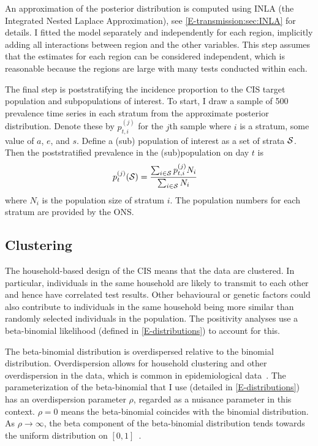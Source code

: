 \documentclass[thesis.tex]{subfiles}
\begin{document}
An approximation of the posterior distribution is computed using INLA (the Integrated Nested Laplace Approximation), see \cref{E-transmission:sec:INLA} for details.
I fitted the model separately and independently for each region, implicitly adding all interactions between region and the other variables.
This step assumes that the estimates for each region can be considered independent, which is reasonable because the regions are large with many tests conducted within each.

The final step is poststratifying the incidence proportion to the CIS target population and subpopulations of interest.
To start, I draw a sample of 500 prevalence time series in each stratum from the approximate posterior distribution.
Denote these by $p^{(j)}_{t,i}$ for the $j$th sample where $i$ is a stratum, \ie some value of $a$, $e$, and $s$.
Define a (sub) population of interest as a set of strata $\mathcal{S}$.
Then the poststratified prevalence in the (sub)population on day $t$ is
\begin{align}
p^{(j)}_t(\mathcal{S})
&= \frac{\sum_{i \in \mathcal{S}} p^{(j)}_{t,i} N_i}{\sum_{i \in \mathcal{S}} N_i}
\end{align}
where $N_i$ is the population size of stratum $i$.
The population numbers for each stratum are provided by the ONS.

\subsection{Clustering} \label{biology-data:sec:clustering}

The household-based design of the CIS means that the data are clustered.
In particular, individuals in the same household are likely to transmit to each other and hence have correlated test results.
Other behavioural or genetic factors could also contribute to individuals in the same household being more similar than randomly selected individuals in the population.
The positivity analyses use a beta-binomial likelihood (defined in \cref{E-distributions}) to account for this.

The beta-binomial distribution is overdispersed relative to the binomial distribution.
Overdispersion allows for household clustering and other overdispersion in the data, which is common in epidemiological data~\autocite{griffithsBBD}.
The parameterization of the beta-binomial that I use (detailed in \cref{E-distributions}) has an overdispersion parameter $\rho$, regarded as a nuisance parameter in this context.
$\rho=0$ means the beta-binomial coincides with the binomial distribution.
As $\rho \to \infty$, the beta component of the beta-binomial distribution tends towards the uniform distribution on $[0, 1]$~\autocite{hughesUsing}.
\end{document}
